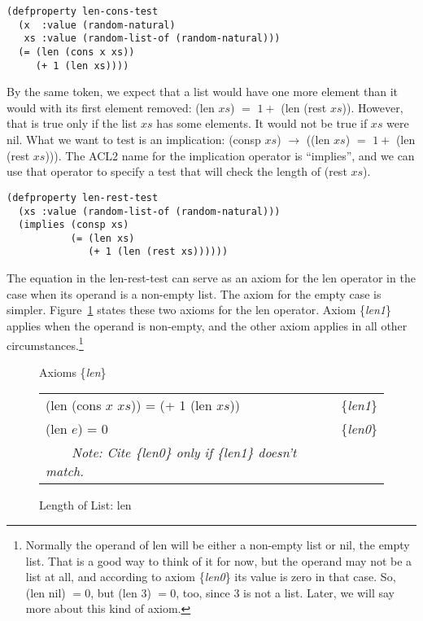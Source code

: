 \begin{Verbatim}
(defproperty len-cons-test
  (x  :value (random-natural)
   xs :value (random-list-of (random-natural)))
  (= (len (cons x xs))
     (+ 1 (len xs))))
\end{Verbatim}

By the same token, we expect that a list would
have one more element than it would with
its first element removed: (len $xs$) $=$ $1 +$ (len (rest $xs$)).
However, that is true only if the list $xs$
has some elements. It would not be true if $xs$ were nil.
What we want to test is an implication:
(consp $xs$) $\rightarrow$ ((len $xs$) $=$ $1 +$ (len (rest $xs$))).
The ACL2 name for the implication operator is ``implies'',
and we can use that operator to specify a test that
will check the length of (rest $xs$).

\begin{Verbatim}
(defproperty len-rest-test
  (xs :value (random-list-of (random-natural)))
  (implies (consp xs)
           (= (len xs)
              (+ 1 (len (rest xs))))))
\end{Verbatim}

The equation in the len-rest-test can serve
as an axiom for the len operator in the case
when its operand is a non-empty list.
The axiom for the empty case is simpler.
Figure~\ref{fig:len-axioms} states these two axioms for
the len operator. Axiom \{\emph{len1}\} applies when
the operand is non-empty, and the other axiom
applies in all other circumstances.\footnote{Normally
the operand of len will be either a non-empty list or nil, the empty list.
That is a good way to think of it for now,
but the operand may not be a list at all,
and according to axiom \{\emph{len0}\} its value is zero in that case.
So, (len nil) $= 0$, but (len $3$) $= 0$, too, since
$3$ is not a list. Later, we will say more about this kind of axiom.}

\begin{figure}
\begin{center}
Axioms \{\emph{len}\} \\
\begin{tabular}{ll}
(len (cons $x$ $xs$)) = (+ 1 (len $xs$)) & \{\emph{len1}\} \\
(len $e$) = 0                            & \{\emph{len0}\} \\
~~~~\emph{Note: Cite \{\emph{len0}\} only if \{\emph{len1}\} doesn't match.}&\\
\end{tabular}
\end{center}
\caption{Length of List: len}
\label{len-equations}
\label{fig:len-axioms}
\end{figure}

